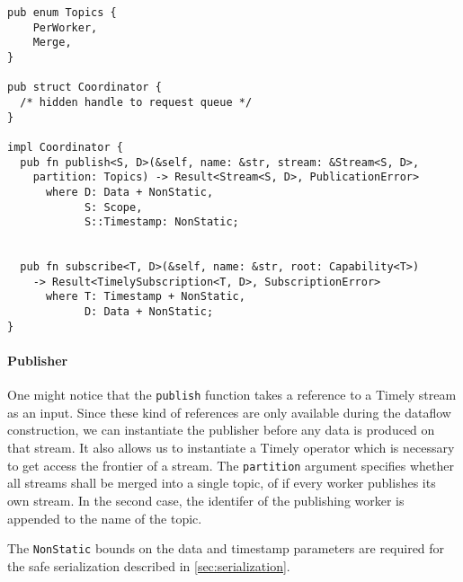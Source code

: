 \begin{lstlisting}[caption={[Publish \& subscribe interface]
The interface for publishing and subscribing Timely streams.
}]
pub enum Topics {
    PerWorker,
    Merge,
}

pub struct Coordinator {
  /* hidden handle to request queue */
}

impl Coordinator {
  pub fn publish<S, D>(&self, name: &str, stream: &Stream<S, D>,
    partition: Topics) -> Result<Stream<S, D>, PublicationError>
      where D: Data + NonStatic, 
            S: Scope,
            S::Timestamp: NonStatic;


  pub fn subscribe<T, D>(&self, name: &str, root: Capability<T>) 
    -> Result<TimelySubscription<T, D>, SubscriptionError>
      where T: Timestamp + NonStatic, 
            D: Data + NonStatic;
}
\end{lstlisting}

\paragraph{Publisher}

One might notice that the \lstinline{publish} function takes a reference to
a Timely stream as an input. Since these kind of references are only available
during the dataflow construction, we can instantiate the publisher before
any data is produced on that stream. It also allows us to instantiate a Timely
operator which is necessary to get access the frontier of a stream. The
\lstinline{partition} argument specifies whether all streams shall be merged
into a single topic, of if every worker publishes its own stream. In the second
case, the identifer of the publishing worker is appended to the name of the topic.

The \lstinline{NonStatic} bounds on the data and timestamp parameters are
required for the safe serialization described in \ref{sec:serialization}.
